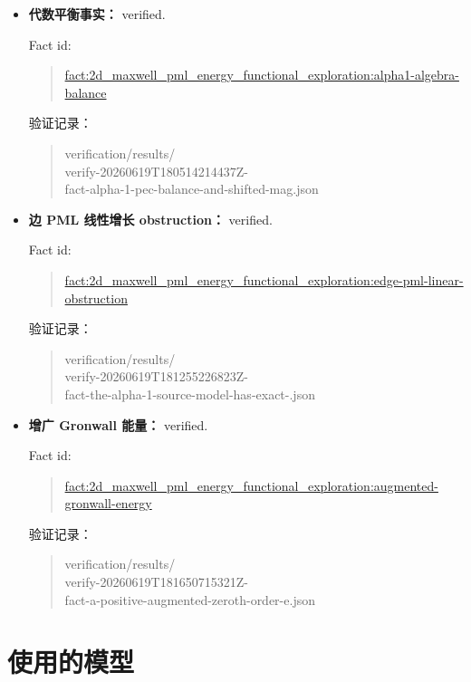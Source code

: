 \documentclass[UTF8,a4paper,12pt]{ctexart}
\begin{document}
\begin{itemize}
\item \textbf{代数平衡事实：} verified.

Fact id:
\begin{quote}\small
\url{fact:2d_maxwell_pml_energy_functional_exploration:alpha1-algebra-balance}
\end{quote}
验证记录：
\begin{quote}\small\ttfamily
verification/results/\\
verify-20260619T180514214437Z-\\
fact-alpha-1-pec-balance-and-shifted-mag.json
\end{quote}

\item \textbf{边 PML 线性增长 obstruction：} verified.

Fact id:
\begin{quote}\small
\url{fact:2d_maxwell_pml_energy_functional_exploration:edge-pml-linear-obstruction}
\end{quote}
验证记录：
\begin{quote}\small\ttfamily
verification/results/\\
verify-20260619T181255226823Z-\\
fact-the-alpha-1-source-model-has-exact-.json
\end{quote}

\item \textbf{增广 Gronwall 能量：} verified.

Fact id:
\begin{quote}\small
\url{fact:2d_maxwell_pml_energy_functional_exploration:augmented-gronwall-energy}
\end{quote}
验证记录：
\begin{quote}\small\ttfamily
verification/results/\\
verify-20260619T181650715321Z-\\
fact-a-positive-augmented-zeroth-order-e.json
\end{quote}
\end{itemize}

\section{使用的模型}
\end{document}
